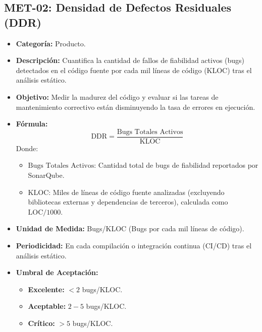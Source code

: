 \documentclass[12pt]{article}
\begin{document}
\vspace{1em}

\subsection{MET-02: Densidad de Defectos Residuales (DDR)}
\label{subsec:met02}

\begin{itemize}
    \item \textbf{Categoría:} Producto.
    \item \textbf{Descripción:} Cuantifica la cantidad de fallos de fiabilidad activos (bugs) detectados en el código fuente por cada mil líneas de código (KLOC) tras el análisis estático.
    \item \textbf{Objetivo:} Medir la madurez del código y evaluar si las tareas de mantenimiento correctivo están disminuyendo la tasa de errores en ejecución.
    \item \textbf{Fórmula:}
    \begin{equation}
        \text{DDR} = \frac{\text{Bugs Totales Activos}}{\text{KLOC}}
    \end{equation}
    Donde:
    \begin{itemize}
        \item $\text{Bugs Totales Activos}$: Cantidad total de bugs de fiabilidad reportados por SonarQube.
        \item $\text{KLOC}$: Miles de líneas de código fuente analizadas (excluyendo bibliotecas externas y dependencias de terceros), calculada como $\text{LOC}/1000$.
    \end{itemize}
    \item \textbf{Unidad de Medida:} Bugs/KLOC (Bugs por cada mil líneas de código).
    \item \textbf{Periodicidad:} En cada compilación o integración continua (CI/CD) tras el análisis estático.
    \item \textbf{Umbral de Aceptación:} 
    \begin{itemize}
        \item \textcolor{process}{\textbf{Excelente:}} $< 2$ bugs/KLOC.
        \item \textcolor{value}{\textbf{Aceptable:}} $2 - 5$ bugs/KLOC.
        \item \textcolor{accentred}{\textbf{Crítico:}} $> 5$ bugs/KLOC.
    \end{itemize}
\end{itemize}
\end{document}
